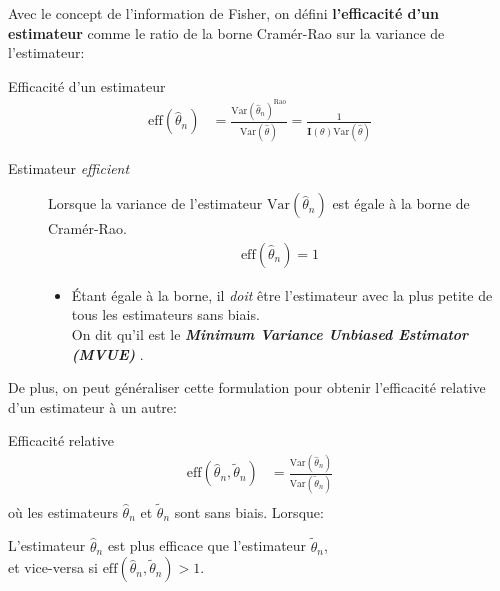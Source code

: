 \documentclass[10pt, french]{article}
\begin{document}
\begin{multicols*}{2}
Avec le concept de l'information de Fisher, on défini \textbf{l'efficacité d'un estimateur} comme le ratio de la borne Cramér-Rao sur la variance de l'estimateur:
\begin{algo}{Efficacité d'un estimateur}
\begin{align*}
	\text{eff}(\hat{\theta}_{n})
	&=	\frac{\text{Var}(\hat{\theta}_{n})^{\text{Rao}}}{\text{Var}(\hat{\theta})} 
	=	\frac{1}{\bm{I}(\theta)\text{Var}(\hat{\theta})}
\end{align*}
\tcbline
\begin{description}
	\item[Estimateur \og \textit{efficient} \fg{}]	Lorsque la variance de l'estimateur $\text{Var}(\hat{\theta}_{n})$ est égale à la borne de Cramér-Rao.
		\begin{align*}
		\text{eff}(\hat{\theta}_{n}) = 1
		\end{align*}
	\begin{itemize}[leftmargin = *]
	\item	Étant égale à la borne, il \textit{doit} être l'estimateur avec la plus petite de tous les estimateurs sans biais.\\
	 		On dit qu'il est le \og \textbf{\textit{Minimum Variance Unbiased Estimator (MVUE)}} \fg{}. 
	\end{itemize}
\end{description}
\end{algo}

De plus, on peut généraliser cette formulation pour obtenir l'efficacité relative d'un estimateur à un autre:
\begin{algo}{Efficacité relative}
\begin{align*}
	\text{eff}(\hat\theta_{n}, \tilde\theta_{n})
	&=	\frac{\text{Var}(\hat\theta_{n})}{\text{Var}(\tilde\theta_{n})}		\\
\end{align*}
où les estimateurs $\hat\theta_{n}$ et $\tilde\theta_{n}$ sont sans biais.
\tcbline
Lorsque:
\begin{description}[font = \normalfont]
	\item[$\text{eff}(\hat\theta_{n}, \tilde\theta_{n}) < 1$:]	L'estimateur $\hat{\theta}_{n}$ est plus efficace que l'estimateur $\tilde{\theta}_{n}$, \\
	et vice-versa si $\text{eff}(\hat\theta_{n}, \tilde\theta_{n}) > 1$.
\end{description}
\end{algo}

\columnbreak

\end{multicols*}
\end{document}
